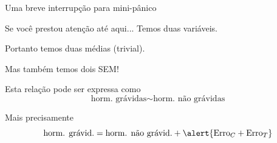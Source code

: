 \documentclass{beamer}
\begin{document}
\begin{frame}{\scriptsize Uma breve interrupção para mini-pânico}
  \begin{block}{Se você prestou atenção até aqui...}
    Temos \alert{duas} variáveis.

    Portanto temos duas médias (trivial).

    \bigskip
    Mas também temos \alert{dois SEM}!
  \end{block}
  \begin{block}{Esta relação pode ser expressa como}
    \begin{displaymath}
      \text{horm. grávidas} \sim \text{horm. não grávidas}
    \end{displaymath}
  \end{block}
  \begin{block}{Mais precisamente}
    \begin{displaymath}
      \text{horm. grávid.} = \text{horm. não grávid.} + \alert{\text{Erro}_C + \text{Erro}_T}
    \end{displaymath}
  \end{block}
\end{frame}
\end{document}
